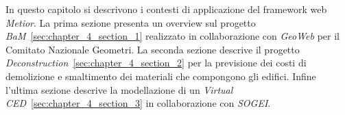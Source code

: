 In questo capitolo si descrivono i contesti di applicazione del framework web \emph{Metior}.
La prima sezione presenta un overview sul progetto \emph{BaM}~\ref{sec:chapter_4_section_1} realizzato
in collaborazione con \emph{GeoWeb} per il Comitato Nazionale Geometri.
La seconda sezione descrive il progetto \emph{Deconstruction}~\ref{sec:chapter_4_section_2} per la previsione dei
costi di demolizione e smaltimento dei materiali che compongono gli edifici.
Infine l'ultima sezione descrive la modellazione di un \emph{Virtual CED}~\ref{sec:chapter_4_section_3}
in collaborazione con \emph{SOGEI}.
